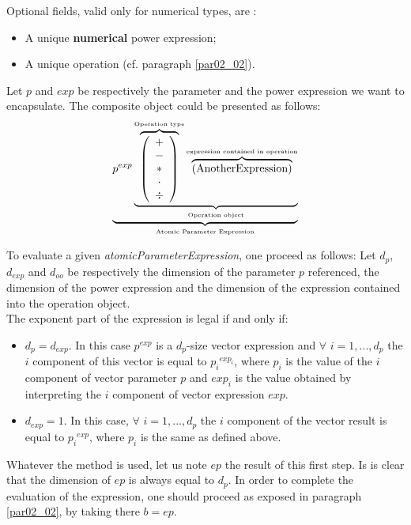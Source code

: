 \documentclass[11pt]{amsart}
\begin{document}
Optional fields, valid only for numerical types, are : 
\begin{itemize}
\item A unique {\bf numerical} power expression;
\item A unique operation (cf. paragraph \ref{par02_02}).\\
\end{itemize}
Let $p$ and $exp$ be respectively the parameter and the power expression we want to encapsulate. The composite object could be presented as follows:
\begin{equation}\label{eq01}
 \underbrace{  p^{exp} \underbrace{  \overbrace{\left( \begin{array}{c} + \\ - \\ \ast  \\ \cdot \\ \div   \end{array} \right) }^{\mbox{\tiny Operation type}}
 \overbrace{    \left( \mbox{AnotherExpression}\right) }^{\mbox{\tiny expression contained in operation}}   }_{\mbox{\tiny Operation object}}}_{\mbox{\tiny Atomic Parameter Expression}}
\end{equation}

To evaluate a given {\it atomicParameterExpression}, one proceed as follows: 
Let $d_p$, $d_{exp}$ and $d_{oo}$ be respectively the dimension of the parameter $p$ referenced, the dimension of the power expression and the dimension of the expression contained into the operation object.\\
The exponent part of the expression is legal if and only if:
\begin{itemize}
\item $d_p=d_{exp}$. In this case $p^{exp}$ is a $d_p$-size vector expression and $\forall$ $i=1,...,d_p$ the $i$ component of this vector is equal to ${p_i}^{exp_i}$, where $p_i$ is the value of the $i$ component of vector parameter $p$ and $exp_i$ is the value obtained by interpreting the $i$ component of vector expression $exp$.
\item $d_{exp}=1$. In this case, $\forall$ $i=1,...,d_p$ the $i$ component of the vector result is equal to ${p_i}^{exp}$, where $p_i$ is the same as defined above.\\
\end{itemize} 

Whatever the method is used, let us note $ep$ the result of this first step. Is is clear that the dimension of $ep$ 
is always equal to $d_p$. In order to complete the evaluation of the expression, one should proceed as exposed in paragraph \ref{par02_02}, by taking there $b=ep$.
\end{document}
